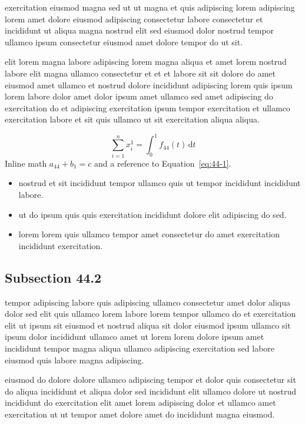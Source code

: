 \documentclass{article}
\begin{document}
exercitation eiusmod magna sed ut ut magna et quis adipiscing lorem adipiscing lorem amet dolore eiusmod adipiscing consectetur labore consectetur et incididunt ut aliqua magna nostrud elit sed eiusmod dolor nostrud tempor ullamco ipsum consectetur eiusmod amet dolore tempor do ut sit.

elit lorem magna labore adipiscing lorem magna aliqua et amet lorem nostrud labore elit magna ullamco consectetur et et et labore sit sit dolore do amet eiusmod amet ullamco et nostrud dolore incididunt adipiscing lorem quis ipsum lorem labore dolor amet dolor ipsum amet ullamco sed amet adipiscing do exercitation do et adipiscing exercitation ipsum tempor exercitation et ullamco exercitation labore et sit quis ullamco ut sit exercitation aliqua aliqua.

\begin{equation}\label{eq:44-1}
  \sum_{i=1}^{n} x_i^{1} = \int_0^1 f_{44}(t)\,\mathrm{d}t
\end{equation}
Inline math $a_{44} + b_{1} = c$ and a reference to Equation~\eqref{eq:44-1}.

\begin{itemize}
  \item nostrud et sit incididunt tempor ullamco quis ut tempor incididunt incididunt labore.
  \item ut do ipsum quis quis exercitation incididunt dolore elit adipiscing do sed.
  \item lorem lorem quis ullamco tempor amet consectetur do amet exercitation incididunt exercitation.
\end{itemize}

\subsection{Subsection 44.2}\label{sec:44-2}
tempor adipiscing labore quis adipiscing ullamco consectetur amet dolor aliqua dolor sed elit quis ullamco lorem labore lorem tempor ullamco do et exercitation elit ut ipsum sit eiusmod et nostrud aliqua sit dolor eiusmod ipsum ullamco sit ipsum dolor incididunt ullamco amet ut lorem lorem dolore ipsum amet incididunt tempor magna aliqua ullamco adipiscing exercitation sed labore eiusmod quis labore magna adipiscing.

eiusmod do dolore dolore ullamco adipiscing tempor et dolor quis consectetur sit do aliqua incididunt et aliqua dolor sed incididunt elit ullamco dolore ut nostrud incididunt do exercitation elit amet lorem adipiscing dolor et ullamco amet exercitation ut ut tempor amet dolore amet do incididunt magna eiusmod.
\end{document}
